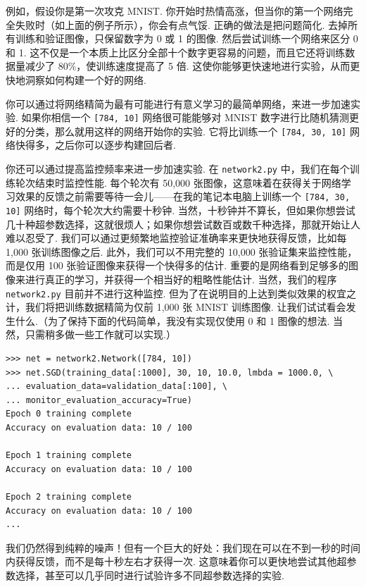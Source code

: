 例如，假设你是第一次攻克 MNIST. 你开始时热情高涨，但当你的第一个网络完全失败时（如上面的例子所示），你会有点气馁. 正确的做法是把问题简化. 去掉所有训练和验证图像，只保留数字为 0 或 1 的图像. 然后尝试训练一个网络来区分 0 和 1. 这不仅是一个本质上比区分全部十个数字更容易的问题，而且它还将训练数据量减少了 80\%，使训练速度提高了 5 倍. 这使你能够更快速地进行实验，从而更快地洞察如何构建一个好的网络.

你可以通过将网络精简为最有可能进行有意义学习的最简单网络，来进一步加速实验. 如果你相信一个 \texttt{[784, 10]} 网络很可能能够对 MNIST 数字进行比随机猜测更好的分类，那么就用这样的网络开始你的实验. 它将比训练一个 \texttt{[784, 30, 10]} 网络快得多，之后你可以逐步构建回后者.

你还可以通过提高监控频率来进一步加速实验. 在 \texttt{network2.py} 中，我们在每个训练轮次结束时监控性能. 每个轮次有 50,000 张图像，这意味着在获得关于网络学习效果的反馈之前需要等待一会儿——在我的笔记本电脑上训练一个 \texttt{[784, 30, 10]} 网络时，每个轮次大约需要十秒钟. 当然，十秒钟并不算长，但如果你想尝试几十种超参数选择，这就很烦人；如果你想尝试数百或数千种选择，那就开始让人难以忍受了. 我们可以通过更频繁地监控验证准确率来更快地获得反馈，比如每 1,000 张训练图像之后. 此外，我们可以不用完整的 10,000 张验证集来监控性能，而是仅用 100 张验证图像来获得一个快得多的估计. 重要的是网络看到足够多的图像来进行真正的学习，并获得一个相当好的粗略性能估计. 当然，我们的程序 \texttt{network2.py} 目前并不进行这种监控. 但为了在说明目的上达到类似效果的权宜之计，我们将把训练数据精简为仅前 1,000 张 MNIST 训练图像. 让我们试试看会发生什么.（为了保持下面的代码简单，我没有实现仅使用 0 和 1 图像的想法. 当然，只需稍多做一些工作就可以实现.）

\begin{lstlisting}
>>> net = network2.Network([784, 10])
>>> net.SGD(training_data[:1000], 30, 10, 10.0, lmbda = 1000.0, \
... evaluation_data=validation_data[:100], \
... monitor_evaluation_accuracy=True)
Epoch 0 training complete
Accuracy on evaluation data: 10 / 100

Epoch 1 training complete
Accuracy on evaluation data: 10 / 100

Epoch 2 training complete
Accuracy on evaluation data: 10 / 100
...

\end{lstlisting}

我们仍然得到纯粹的噪声！但有一个巨大的好处：我们现在可以在不到一秒的时间内获得反馈，而不是每十秒左右才获得一次. 这意味着你可以更快地尝试其他超参数选择，甚至可以几乎同时进行试验许多不同超参数选择的实验.

